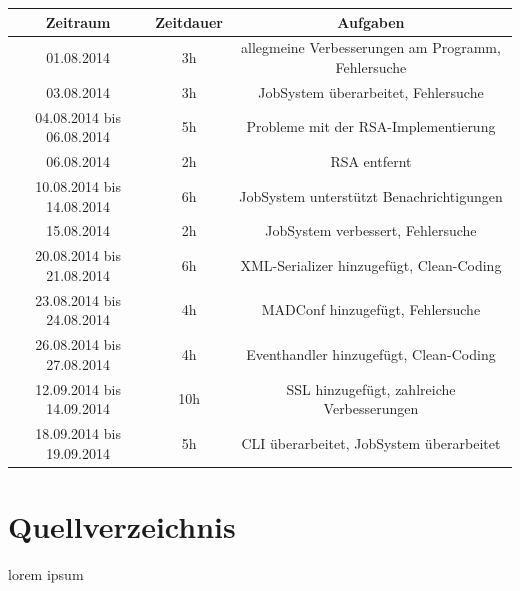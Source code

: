 \documentclass[12pt,a4paper]{report}
\begin{document}
\begin{onehalfspace}
\begin{center}
\begin{tabular}{c|c|c}
\end{tabular}
\end{center}

\newpage

\begin{center}
\begin{tabular}{c | c | c}

\textbf{Zeitraum} & \textbf{Zeitdauer} & \textbf{Aufgaben} \\ \hline
01.08.2014 & 3h & allegmeine Verbesserungen am Programm, Fehlersuche\\
03.08.2014 & 3h & JobSystem überarbeitet, Fehlersuche\\
04.08.2014 bis 06.08.2014 & 5h & Probleme mit der RSA-Implementierung\\
06.08.2014 & 2h & RSA entfernt\\
10.08.2014 bis 14.08.2014 & 6h & JobSystem unterstützt Benachrichtigungen\\
15.08.2014 & 2h & JobSystem verbessert, Fehlersuche\\
20.08.2014 bis 21.08.2014 & 6h & XML-Serializer hinzugefügt, Clean-Coding\\
23.08.2014 bis 24.08.2014 & 4h & MADConf hinzugefügt, Fehlersuche\\
26.08.2014 bis 27.08.2014 & 4h & Eventhandler hinzugefügt, Clean-Coding\\
12.09.2014 bis 14.09.2014 & 10h & SSL hinzugefügt, zahlreiche Verbesserungen\\
18.09.2014 bis 19.09.2014 & 5h & CLI überarbeitet, JobSystem überarbeitet\\


\end{tabular}
\end{center}

\part{Quellverzeichnis}
lorem ipsum


\end{onehalfspace}
\end{document}
